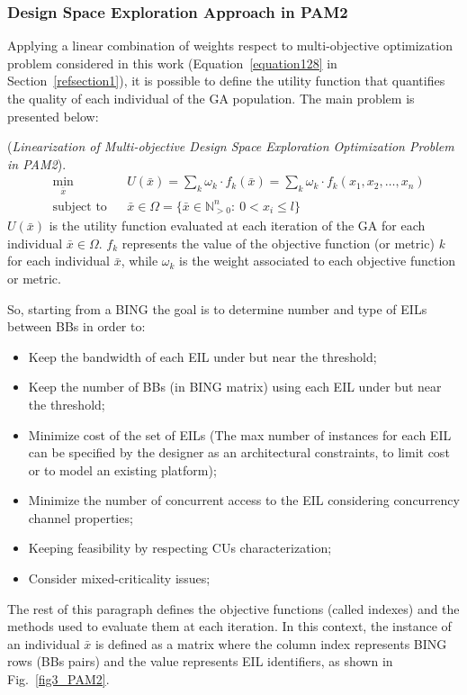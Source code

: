 \subsubsection{Design Space Exploration Approach in PAM2} \label{dse_PAM2_index_def}
%
Applying a linear combination of weights respect to multi-objective optimization problem considered in this work (Equation~\ref{equation128} in Section~\ref{refsection1}), it is possible to define the utility function that quantifies the quality of each individual of the GA population.
%
The main problem is presented below:
\theoremstyle{definition}
\begin{definition}{(\textit{Linearization of Multi-objective Design Space Exploration Optimization Problem in PAM2}).}
%
%
\begin{equation} \label{equation131_PAM2}
  \begin{aligned}
    & \underset{\bar x}{\text{min}} &  & U(\bar x) = \sum_{k} \omega_{k} \cdot f_{k}(\bar x) = \sum_{k} \omega_{k} \cdot f_{k}(x_1, x_2, \ldots, x_n)\\
    & \text{subject to}             &  & \bar x \in \Omega = \{ \bar x  \in \mathbb{N}_{> 0}^{n} : \ 0 < x_i \leq l \}
\end{aligned}
\end{equation}
%
$U(\bar x)$ is the utility function evaluated at each iteration of the GA for each individual $\bar x \in \Omega$. \textit{$f_{k}$} represents the value of the objective function (or metric) \textit{k} for each individual \textit{$\bar x$}, while \textit{$\omega_{k}$} is the weight associated to each objective function or metric. 
\end{definition}
So, starting from a BING the goal is to determine number and type of EILs between BBs in order to:
%
\begin{itemize}
    \item Keep the bandwidth of each EIL under but near the threshold;
    \item Keep the number of BBs (in BING matrix) using each EIL under but near the threshold;
    \item Minimize cost of the set of EILs (The max number of instances for each EIL can be specified by the designer as an architectural constraints, to limit cost or to model an existing platform);
    \item Minimize the number of concurrent access to the EIL considering concurrency channel properties;
    \item Keeping feasibility by respecting CUs characterization;
    \item Consider mixed-criticality issues;
\end{itemize}
%
The rest of this paragraph defines the objective functions (called indexes) and the methods used to evaluate them at each iteration. In this context, the instance of an individual \textit{$\bar x$} is defined as a matrix where the column index represents BING rows (BBs pairs) and the value represents EIL identifiers, as shown in Fig.~\ref{fig3_PAM2}. \par

